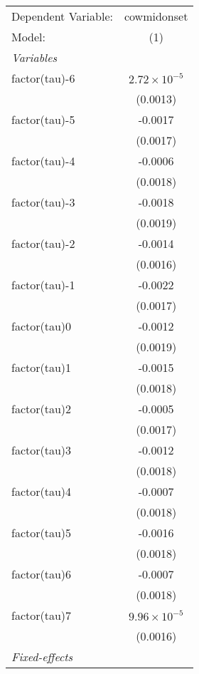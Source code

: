 \begingroup
\centering
\begin{tabular}{lc}
   \tabularnewline \midrule \midrule
   Dependent Variable: & cowmidonset\\  
   Model:              & (1)\\  
   \midrule
   \emph{Variables}\\
   factor(tau)-6       & $2.72\times 10^{-5}$\\    
                       & (0.0013)\\   
   factor(tau)-5       & -0.0017\\   
                       & (0.0017)\\   
   factor(tau)-4       & -0.0006\\   
                       & (0.0018)\\   
   factor(tau)-3       & -0.0018\\   
                       & (0.0019)\\   
   factor(tau)-2       & -0.0014\\   
                       & (0.0016)\\   
   factor(tau)-1       & -0.0022\\   
                       & (0.0017)\\   
   factor(tau)0        & -0.0012\\   
                       & (0.0019)\\   
   factor(tau)1        & -0.0015\\   
                       & (0.0018)\\   
   factor(tau)2        & -0.0005\\   
                       & (0.0017)\\   
   factor(tau)3        & -0.0012\\   
                       & (0.0018)\\   
   factor(tau)4        & -0.0007\\   
                       & (0.0018)\\   
   factor(tau)5        & -0.0016\\   
                       & (0.0018)\\   
   factor(tau)6        & -0.0007\\   
                       & (0.0018)\\   
   factor(tau)7        & $9.96\times 10^{-5}$\\    
                       & (0.0016)\\   
   \midrule
   \emph{Fixed-effects}\\

\end{tabular}
